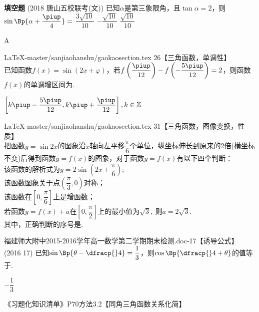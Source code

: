 \begin{exercise}{\bf 填空题}
        {\kaishu (2018 \textbullet 唐山五校联考(文))}
        已知$\alpha$是第三象限角，且$\tan\alpha=2$，则$\sin\Bp{\alpha+\dfrac{\piup}4}=$\xz
         {$\dfrac{3\sqrt{10}}{10}$}
         {$-\dfrac{\sqrt{10}}{10}$}
         {$\dfrac{\sqrt{10}}{10}$}
        \begin{answer}
          A
        \end{answer}
    \item LaTeX-master/sanjiaohanshu/gaokaosection.tex 26【三角函数，单调性】\\
      已知函数$f(x)=\sin (2x+\varphi)$，若$    f\left(\dfrac{\piup}{12}\right)-f\left(-\dfrac{5\piup}{12}\right)=2 $，则函数$f(x)$的单调增区间为\tk.
      \begin{answer}
        $\left[k\piup-\dfrac{5\piup}{12},k\piup+\dfrac{\piup}{12}\right],k\in\mathbb{Z}$
      \end{answer}
    \item LaTeX-master/sanjiaohanshu/gaokaosection.tex 31【三角函数，图像变换，性质】\\
      把函数$ y=\sin 2x $的图象沿$x$轴向左平移$ \dfrac{\pi}{6} $个单位，纵坐标伸长到原来的2倍(横坐标不变)后得到函数$ y=f(x) $的图象，对于函数$ y=f(x) $有以下四个判断：\\
       该函数的解析式为$ y=2\sin \left(2x+\dfrac{\pi}{6}\right) $;\\
       该函数图象关于点$ \left(\dfrac{\pi}{3},0\right) $对称；\\
       该函数在$ \left[0,\dfrac{\pi}{6}\right] $上是增函数；\\
       若函数$ y=f(x)+a $在$ \left[0,\dfrac{\pi}{2}\right] $上的最小值为$ \sqrt{3},\  $则$ a=2\sqrt{3} .$\\
      其中，正确判断的序号是\tk.
      \begin{answer}
      \end{answer}
    \item 福建师大附中2015-2016学年高一数学第二学期期末检测.doc-17【诱导公式】\\
      (2016  17)
      已知$\sin\Bp{\theta-\dfracp{}4}=\dfrac13$，则$\cos\Bp{\dfracp{}4+\theta}$的值等于\tk.
      \begin{answer}
        $-\dfrac13$
      \end{answer}
    \item 《习题化知识清单》P70方法3.2【同角三角函数关系化简】\\

\end{exercise}
